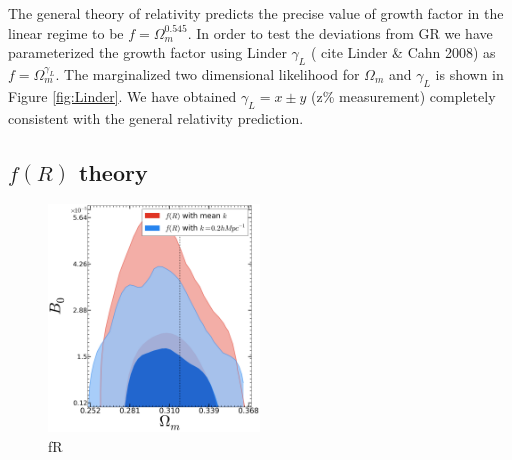 The general theory of relativity predicts the precise value of growth factor in the linear regime to be $f=\Omega_m^{0.545}$.  In order to test the deviations from GR we have parameterized the growth factor using Linder $\gamma_L$ ( cite Linder \& Cahn 2008) as $f=\Omega_m^{\gamma_L}$. The marginalized two dimensional likelihood for $\Omega_m$ and $\gamma_L$ is shown in Figure \ref{fig:Linder}. We have obtained $\gamma_L = x \pm y$ (z\% measurement) completely consistent with the general relativity prediction.


\subsection{$f(R)$ theory}
\begin{figure}
    \begin{center}        
        \includegraphics[width=0.5\textwidth]{plots/Like-2D/fR-omegam-lambda1_2_2D.png}
     \end{center}
     \caption{fR}
     \label{fig:fR}
\end{figure}

